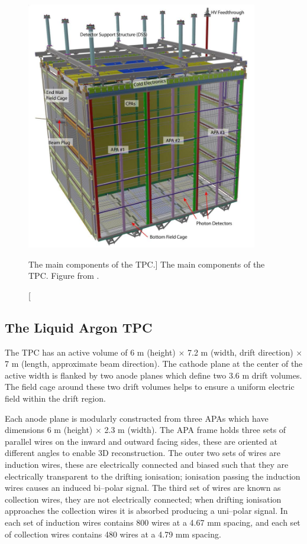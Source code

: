 \begin{figure}

	\centering

	\includegraphics[width=0.9\textwidth]{figures/pdsp_tpc.jpg}

	\caption
	[The main components of the \protodune{} TPC.]
	{The main components of the \protodune{} TPC. Figure from \cite{Abi2017}.}

	\label{fig:pdsp_tpc}

\end{figure}

\subsection{The Liquid Argon TPC}

The \protodune{} TPC has an active volume of 6 m (height) $\times$ 7.2 m (width,
drift direction) $\times$ 7 m (length, approximate beam direction). The cathode 
plane at the center of the active width is flanked by two anode planes which 
define two 3.6 m drift volumes. The field cage around these two drift volumes
helps to ensure a uniform electric field within the drift region.

Each anode plane is modularly constructed from three APAs which have dimensions
6 m (height) $\times$ 2.3 m (width). The APA frame holds three sets of parallel
wires on the inward and outward facing sides, these are oriented at different 
angles to enable 3D reconstruction. The outer two sets of wires are induction
wires, these are electrically connected and biased such that they are
electrically transparent to the drifting ionisation; ionisation passing the
induction wires causes an induced bi--polar signal. The third set of wires are 
known as collection wires, they are not electrically connected; when drifting 
ionisation approaches the collection wires it is absorbed producing a 
uni--polar signal. In \protodune{} each set of induction wires contains 800
wires at a 4.67 mm spacing, and each set of collection wires contains 480 
wires at a 4.79 mm spacing. 


